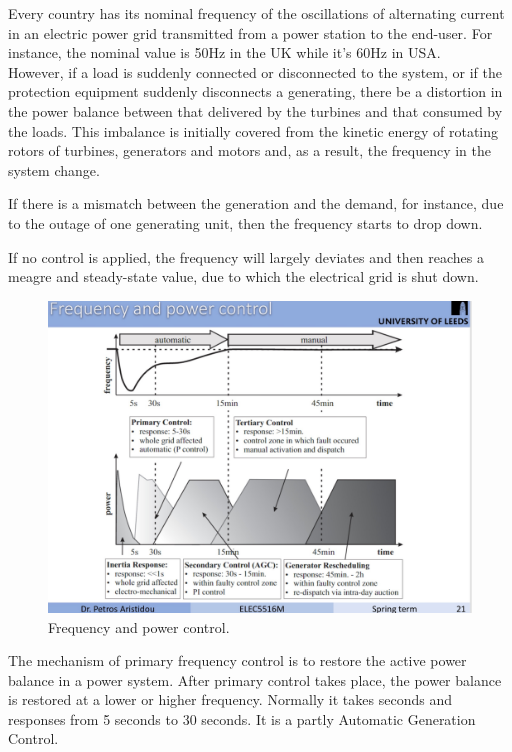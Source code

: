Every country has its nominal frequency of the oscillations of alternating current in an electric power grid transmitted from a power station to the end-user. For instance, the nominal value is 50Hz \cite{papadopoulos2009distribution} in the UK while it’s 60Hz \cite{komarnicki2008practical} in USA.\\

However, \cite{machowski2011power} if a load is suddenly connected or disconnected to the system, or if the protection equipment suddenly disconnects a generating, there be a distortion in the power balance between that delivered by the turbines and that consumed by the loads. This imbalance is initially covered from \cite{machowski2011power} the kinetic energy of rotating rotors of turbines, generators and motors and, as a result, the frequency in the system change.

If there is a mismatch between the generation and the demand, for instance, due to the outage of one generating unit, then the frequency starts to drop down.  

If no control is applied, the frequency will largely deviates and then reaches a meagre and steady-state value, due to which the electrical grid is shut down.\\

\begin{figure}[t]
\center
\includegraphics[scale=0.2]{figure/2_1_freq.jpeg}
\caption{Frequency and power control.}
\label{2_1_freq}
\end{figure}

The mechanism of primary frequency control is to restore the active power balance in a power system. After primary control takes place, the power balance is restored at a lower or higher frequency. Normally it takes seconds and responses from 5 seconds to 30 seconds. It is a partly Automatic Generation Control.\\


